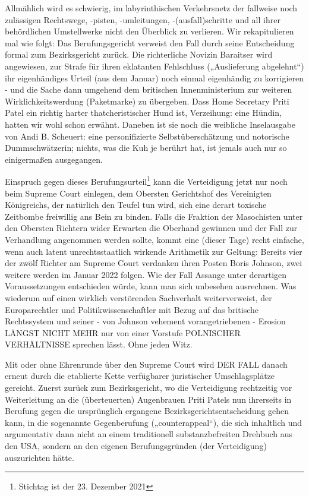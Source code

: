 \begin{multicols}{2}
Allmählich wird es schwierig, im labyrinthischen Verkehrsnetz der fallweise noch zulässigen Rechtswege,
-pisten, -umleitungen, -(ausfall)schritte und all ihrer behördlichen Umstellwerke nicht den Überblick zu verlieren. Wir rekapitulieren mal wie folgt: Das Berufungsgericht verweist den Fall durch seine Entscheidung formal
zum Bezirksgericht zurück. Die richterliche Novizin Baraitser wird angewiesen, zur Strafe für ihren eklatanten
Fehlschluss („Auslieferung abgelehnt“) ihr eigenhändiges Urteil (aus dem Januar) noch einmal eigenhändig zu
korrigieren - und die Sache dann umgehend dem britischen Innenministerium zur weiteren Wirklichkeitswerdung (Paketmarke) zu übergeben. Dass Home Secretary
Priti Patel ein richtig harter thatcheristischer Hund ist,
Verzeihung: eine Hündin, hatten wir wohl schon erwähnt. Daneben ist sie noch die weibliche Inselausgabe
von Andi B. Scheuert: eine personifizierte Selbstüberschätzung und notorische Dummschwätzerin; nichts,
was die Kuh je berührt hat, ist jemals auch nur so einigermaßen ausgegangen.

Einspruch gegen dieses Berufungsurteil\footnote[36]{Stichtag ist der 23. Dezember 2021} kann die Verteidigung jetzt nur noch beim Supreme Court einlegen,
dem Obersten Gerichtshof des Vereinigten Königreichs,
der natürlich den Teufel tun wird, sich eine derart toxische Zeitbombe freiwillig ans Bein zu binden. Falls die
Fraktion der Masochisten unter den Obersten Richtern
wider Erwarten die Oberhand gewinnen und der Fall zur
Verhandlung angenommen werden sollte, kommt eine
(dieser Tage) recht einfache, wenn auch latent unrechtsstaatlich wirkende Arithmetik zur Geltung: Bereits vier
der zwölf Richter am Supreme Court verdanken ihren
Posten Boris Johnson, zwei weitere werden im Januar
2022 folgen. Wie der Fall Assange unter derartigen Voraussetzungen entschieden würde, kann man sich unbesehen ausrechnen. Was wiederum auf einen wirklich
verstörenden Sachverhalt weiterverweist, der Europarechtler und Politikwissenschaftler mit Bezug auf das
britische Rechtssystem und seiner - von Johnson vehement vorangetriebenen - Erosion LÄNGST NICHT
MEHR nur von einer Vorstufe POLNISCHER VERHÄLTNISSE sprechen lässt. Ohne jeden Witz.

Mit oder ohne Ehrenrunde über den Supreme Court wird
DER FALL danach erneut durch die etablierte Kette verfügbarer juristischer Umschlagsplätze gereicht. Zuerst
zurück zum Bezirksgericht, wo die Verteidigung rechtzeitig vor Weiterleitung an die (überteuerten) Augenbrauen Priti Patels nun ihrerseits in Berufung gegen die %
ursprünglich ergangene Bezirksgerichtsentscheidung
gehen kann, in die sogenannte Gegenberufung („counterappeal“), die sich inhaltlich und argumentativ dann
nicht an einem traditionell substanzbefreiten Drehbuch
aus den USA, sondern an den eigenen Berufungsgründen (der Verteidigung) auszurichten hätte.


\end{multicols}
